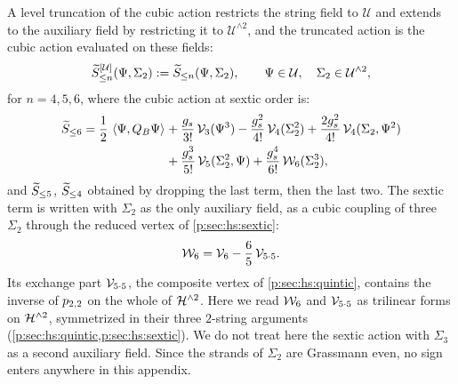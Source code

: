 A level truncation of the cubic action restricts the string field to $\mathcal U$ and extends to the auxiliary field by restricting it to $\mathcal U^{\wedge 2}$, and the truncated action is the cubic action evaluated on these fields:
\begin{equation}
  \label{p:eq:trunc:action}
  \caction[\le n]^{[\mathcal U]}(\Psi, \Sigma_2)
    := \caction[\le n](\Psi, \Sigma_2),
  \qquad
  \Psi \in \mathcal U,
  \quad
  \Sigma_2 \in \mathcal U^{\wedge 2},
\end{equation}
for $n = 4, 5, 6$, where the cubic action at sextic order is:
\begin{equation}
  \label{p:eq:trunc:action-explicit}
  \begin{aligned}
    \caction[\le 6]
      = \frac{1}{2} \, \pair{\Psi}{Q_B \Psi}
        &
        + \frac{\gs}{3!} \, \vertex{3}(\Psi^3)
        - \frac{\gs^2}{4!} \, \vertex{4}(\Sigma_2^2)
        + \frac{2 \gs^2}{4!} \, \vertex{4}(\Sigma_2, \Psi^2)
      \\
      &
      + \frac{\gs^3}{5!} \, \vertex{5}(\Sigma_2^2, \Psi)
      + \frac{\gs^4}{6!} \, \dvertex{6}(\Sigma_2^3),
  \end{aligned}
\end{equation}
and $\caction[\le 5]$, $\caction[\le 4]$ obtained by dropping the last term, then the last two.
The sextic term is written with $\Sigma_2$ as the only auxiliary field, as a cubic coupling of three $\Sigma_2$ through the reduced vertex of \cref{p:sec:hs:sextic}:
\begin{equation}
\label{p:eq:trunc:W6}
\dvertex{6}
  = \vertex{6} - \frac{6}{5} \, \vertex{5 \cdot 5}.
\end{equation}
Its exchange part $\vertex{5 \cdot 5}$, the composite vertex of \cref{p:sec:hs:quintic}, contains the inverse of $\sprod{2}{2}$ on the whole of $\Hn{2}$.
Here we read $\dvertex{6}$ and $\vertex{5 \cdot 5}$ as trilinear forms on $\Hn{2}$, symmetrized in their three $2$-string arguments (\cref{p:sec:hs:quintic,p:sec:hs:sextic}).
We do not treat here the sextic action with $\Sigma_3$ as a second auxiliary field.
Since the strands of $\Sigma_2$ are Grassmann even, no sign enters anywhere in this appendix.

